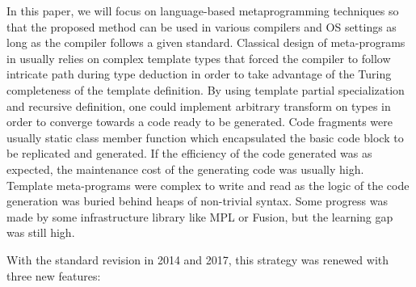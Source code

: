 \documentclass[../main]{subfiles}
\begin{document}
In this paper, we will focus on language-based metaprogramming
techniques so that the proposed method can
be used in various compilers and OS settings as long as the
compiler follows a given standard.
Classical design of meta-programs in \cpp usually relies
on complex template types that forced the compiler to follow
intricate path during type deduction in order to take advantage
of the Turing completeness of the template definition. By
using template partial specialization and recursive definition,
one could implement arbitrary transform on types in order
to converge towards a code ready to be generated. Code
fragments were usually static class member function which
encapsulated the basic code block to be replicated and
generated. If the efficiency of the code generated was as
expected, the maintenance cost of the generating code was
usually high. Template meta-programs were complex to write
and read as the logic of the code generation was buried
behind heaps of non-trivial syntax. Some progress was made
by some infrastructure library like MPL\cite{hpcs16} or Fusion, but
the learning gap was still high.

With the standard \cpp revision in 2014 and 2017, this
strategy was renewed with three new \cpp features:
\end{document}
